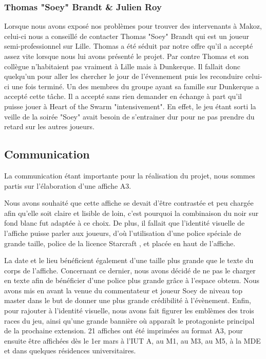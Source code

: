 \subsubsection{Thomas "Soey" Brandt \& Julien Roy}%
\label{ssub:tthomas_soey_brandt_&_julien_roy}

Lorsque nous avons exposé nos problèmes pour trouver des intervenants à
Makoz, celui-ci nous a conseillé de contacter Thomas "Soey" Brandt qui
est un joueur semi-professionnel sur Lille. Thomas a été séduit par
notre offre qu'il a accepté assez vite lorsque nous lui avons présenté
le projet. Par contre Thomas et son collègue n'habitaient pas vraiment à
Lille mais à Dunkerque. Il fallait donc quelqu'un pour aller les
chercher le jour de l'évennement puis les reconduire celui-ci une fois
terminé. Un des membres du groupe ayant sa famille sur Dunkerque a
accepté cette tâche. Il a accepté sans rien demander en échange à part
qu'il puisse jouer à Heart of the Swarm "intensivement". En effet, le
jeu étant sorti la veille de la soirée "Soey" avait besoin de
s'entrainer dur pour ne pas prendre du retard sur les autres joueurs.


\subsection{Communication}%
\label{sub:communication}

La communication étant importante pour la réalisation du projet, nous sommes 
partis sur l'élaboration d'une affiche A3.

Nous avons souhaité que cette affiche se devait d’être contrastée et peu chargée 
afin qu’elle soit claire et lisible de loin, c’est pourquoi la combinaison du noir 
sur fond blanc fut adaptée à ce choix. De plus, il fallait que l’identité visuelle 
de l’affiche puisse parler aux joueurs, d’où l’utilisation d’une police spéciale 
de grande taille, police de la licence \og Starcraft \fg{}, et placée en haut de l’affiche.

La date et le lieu bénéficient également d’une taille plus grande que le texte du 
corps de l’affiche. Concernant ce dernier, nous avons décidé de ne pas le charger 
en texte afin de bénéficier d’une police plus grande grâce à l’espace obtenu.
Nous avons mis en avant la venue du commentateur et joueur Soey  de niveau \og top master \fg{} 
dans le but de donner une plus grande crédibilité à l’évènement.
Enfin, pour rajouter à l’identité visuelle, nous avons fait figurer les emblèmes des 
trois races du jeu, ainsi qu’une grande bannière où apparaît le protagoniste principal 
de la prochaine extension. 
21 affiches ont été imprimées au format A3, pour ensuite être affichées dès le 1er mars à l’IUT A, au M1,
au M3, au M5, à la MDE et dans quelques résidences universitaires.

